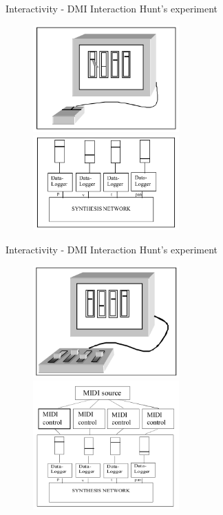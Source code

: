 \documentclass{beamer}
\begin{document}
\begin{frame}{Interactivity - DMI Interaction} 
    Hunt's experiment\\
    \vspace{5mm}
    \begin{figure}[h]
        \includegraphics[width=0.5\textwidth]{Hunt2000_interfaceA.png}
        \includegraphics[width=0.5\textwidth]{hunt2000_mapping_a.png}
    \end{figure}
\end{frame}

\begin{frame}{Interactivity - DMI Interaction} 
    Hunt's experiment\\
    \vspace{5mm}
    \vspace{5mm}
    \begin{figure}[h]
        \includegraphics[width=0.5\textwidth]{hunt2000_interfaceB.png}
        \includegraphics[width=0.5\textwidth]{hunt2000_mapping_b.png}
    \end{figure}
\end{frame}
\end{document}
